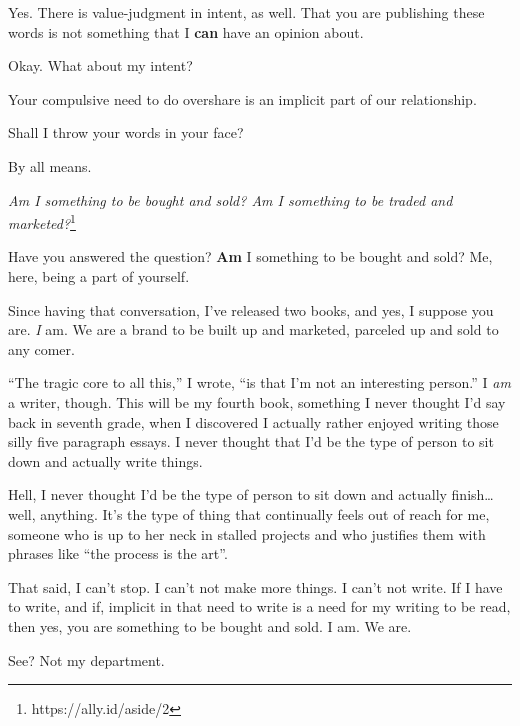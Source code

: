 \begin{paracol}{2}
\begin{leftcolumn}
\begin{ally}
Yes. There is value-judgment in intent, as well. That you are publishing these words is not something that I \textbf{can} have an opinion about.
\end{ally}
Okay. What about my intent?

\begin{ally}
Your compulsive need to do overshare is an implicit part of our relationship.
\end{ally}
Shall I throw your words in your face?

\begin{ally}
By all means.
\end{ally}
\emph{Am I something to be bought and sold? Am I something to be traded and marketed?}\footnote{https://ally.id/aside/2}

\begin{ally}
Have you answered the question? \textbf{Am} I something to be bought and sold? Me, here, being a part of yourself.
\end{ally}
Since having that conversation, I've released two books, and yes, I suppose you are. \emph{I} am. We are a brand to be built up and marketed, parceled up and sold to any comer.

``The tragic core to all this,'' I wrote, ``is that I'm not an interesting person.'' I \emph{am} a writer, though. This will be my fourth book, something I never thought I'd say back in seventh grade, when I discovered I actually rather enjoyed writing those silly five paragraph essays. I never thought that I'd be the type of person to sit down and actually write things.

Hell, I never thought I'd be the type of person to sit down and actually finish\ldots{}well, anything. It's the type of thing that continually feels out of reach for me, someone who is up to her neck in stalled projects and who justifies them with phrases like ``the process is the art''.

That said, I can't stop. I can't not make more things. I can't not write. If I have to write, and if, implicit in that need to write is a need for my writing to be read, then yes, you are something to be bought and sold. I am. We are.

\begin{ally}
See? Not my department.
\end{ally}
\newpage
  \end{leftcolumn}
\end{paracol}
